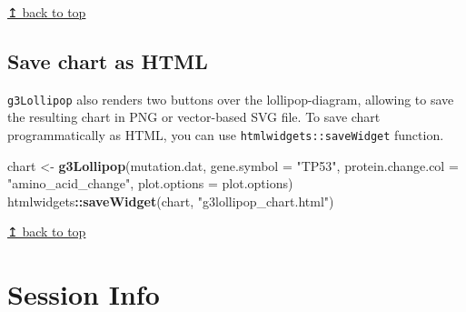\documentclass[
]{article}
\newenvironment{Shaded}{\begin{snugshade}}{\end{snugshade}}
\newcommand{\AttributeTok}[1]{\textcolor[rgb]{0.13,0.29,0.53}{#1}}
\newcommand{\FunctionTok}[1]{\textcolor[rgb]{0.13,0.29,0.53}{\textbf{#1}}}
\newcommand{\NormalTok}[1]{#1}
\newcommand{\OtherTok}[1]{\textcolor[rgb]{0.56,0.35,0.01}{#1}}
\newcommand{\SpecialCharTok}[1]{\textcolor[rgb]{0.81,0.36,0.00}{\textbf{#1}}}
\newcommand{\StringTok}[1]{\textcolor[rgb]{0.31,0.60,0.02}{#1}}
\begin{document}
\hyperref[top]{↥ back to top}

\subsection{\texorpdfstring{ Save chart as
HTML}{ Save chart as HTML}}\label{save-chart-as-html}

\texttt{g3Lollipop} also renders two buttons over the lollipop-diagram,
allowing to save the resulting chart in PNG or vector-based SVG file. To
save chart programmatically as HTML, you can use
\texttt{htmlwidgets::saveWidget} function.

\begin{Shaded}
\begin{Highlighting}[]
\NormalTok{chart }\OtherTok{\textless{}{-}} \FunctionTok{g3Lollipop}\NormalTok{(mutation.dat,}
                    \AttributeTok{gene.symbol =} \StringTok{"TP53"}\NormalTok{,}
                    \AttributeTok{protein.change.col =} \StringTok{"amino\_acid\_change"}\NormalTok{,}
                    \AttributeTok{plot.options =}\NormalTok{ plot.options)}
\NormalTok{htmlwidgets}\SpecialCharTok{::}\FunctionTok{saveWidget}\NormalTok{(chart, }\StringTok{"g3lollipop\_chart.html"}\NormalTok{)}
\end{Highlighting}
\end{Shaded}

\hyperref[top]{↥ back to top}

\section{Session Info}\label{session-info}
\end{document}
